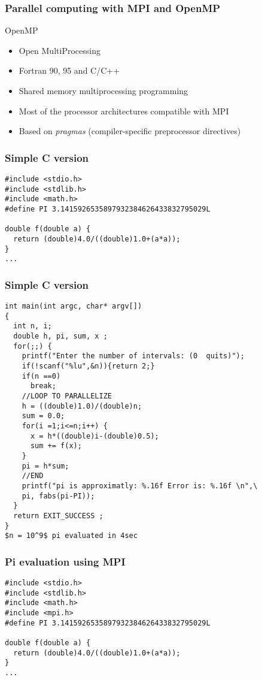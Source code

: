 \documentclass[12pt]{beamer}
\begin{document}
\begin{frame}
  \frametitle{Parallel computing with MPI and OpenMP}
  \begin{block}{OpenMP}
    \begin{itemize}[<+->]
    \item Open MultiProcessing
    \item Fortran 90, 95 and C/C++
    \item Shared memory multiprocessing programming
    \item Most of the processor architectures compatible with MPI
    \item Based on \emph{pragmas} (compiler-specific preprocessor directives)
    \end{itemize}
  \end{block}
\end{frame}

\begin{frame}[fragile]
  \frametitle{Simple C version}
  \begin{verbatim}
#include <stdio.h>
#include <stdlib.h>
#include <math.h>
#define PI 3.1415926535897932384626433832795029L

double f(double a) {
  return (double)4.0/((double)1.0+(a*a));
}
...
  \end{verbatim}
\end{frame}

\begin{frame}[fragile]
  \frametitle{Simple C version}
  \begin{verbatim}
int main(int argc, char* argv[])
{
  int n, i;
  double h, pi, sum, x ;
  for(;;) {
    printf("Enter the number of intervals: (0  quits)");
    if(!scanf("%lu",&n)){return 2;}
    if(n ==0)
      break;
    //LOOP TO PARALLELIZE
    h = ((double)1.0)/(double)n;
    sum = 0.0;
    for(i =1;i<=n;i++) {
      x = h*((double)i-(double)0.5);
      sum += f(x);
    }
    pi = h*sum;
    //END
    printf("pi is approximatly: %.16f Error is: %.16f \n",\
    pi, fabs(pi-PI));
  }
  return EXIT_SUCCESS ;
}
$n = 10^9$ pi evaluated in 4sec
  \end{verbatim}
\end{frame}

\begin{frame}[fragile]
  \frametitle{Pi evaluation using MPI}
  \begin{verbatim}
#include <stdio.h>
#include <stdlib.h>
#include <math.h>
#include <mpi.h>
#define PI 3.1415926535897932384626433832795029L

double f(double a) {
  return (double)4.0/((double)1.0+(a*a));
}
...
  \end{verbatim}
\end{frame}
\end{document}
